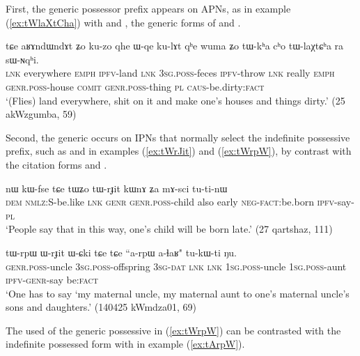 First, the generic possessor prefix appears on APNs, as in example (\ref{ex:tWlaXtCha}) with  and , the generic forms of  and .

\begin{exe}
\ex \label{ex:tWlaXtCha}
\gll tɕe  	aʁɤndɯndɤt  	ʑo  	ku-zo  	qhe  	ɯ-qe  	ku-lɤt  	qʰe	wuma  ʑo  	tɯ-kʰa  	cʰo  	tɯ-laχtɕʰa  	ra  	sɯ-ɴqʰi.  \\
\textsc{lnk} everywhere \textsc{emph} \textsc{ipfv}-land \textsc{lnk} \textsc{3sg.poss}-feces \textsc{ipfv}-throw \textsc{lnk} really \textsc{emph} \textsc{genr.poss}-house \textsc{comit} \textsc{genr.poss}-thing \textsc{pl} \textsc{caus}-be.dirty:\textsc{fact} \\
\glt `(Flies) land everywhere, shit on it and make one's houses and things dirty.' (25 akWzgumba, 59)
\end{exe}

Second, the generic  occurs on IPNs that normally select the  indefinite possessive prefix, such as  and  in examples (\ref{ex:tWrJit}) and (\ref{ex:tWrpW}), by contrast with the citation forms   and .

\begin{exe}
\ex \label{ex:tWrJit}
\gll nɯ 	kɯ-fse 	tɕe 	tɯʑo 	tɯ-rɟit 	kɯnɤ 	ʑa 	mɤ-sci 	tu-ti-nɯ \\
\textsc{dem} \textsc{nmlz}:S-be.like \textsc{lnk} \textsc{genr} \textsc{genr.poss}-child also early \textsc{neg-fact}:be.born \textsc{ipfv}-say-\textsc{pl} \\
\glt `People say that in this way, one's child will be born late.' (27 qartshaz, 111)
\end{exe}

\begin{exe}
\ex \label{ex:tWrpW}
\gll  tɯ-rpɯ 	ɯ-rɟit 	ɯ-ɕki 	tɕe 	tɕe 	``a-rpɯ a-ɬaʁ" 	tu-kɯ-ti 	ŋu. \\
\textsc{genr.poss}-uncle \textsc{3sg.poss}-offspring \textsc{3sg-dat} \textsc{lnk} \textsc{lnk} \textsc{1sg.poss}-uncle \textsc{1sg.poss}-aunt \textsc{ipfv-genr}-say  be:\textsc{fact} \\
\glt `One has to say `my maternal uncle, my maternal aunt to one's maternal uncle's sons and daughters.' (140425 kWmdza01, 69)
\end{exe}

The used of the generic possessive  in (\ref{ex:tWrpW}) can be contrasted with the indefinite possessed form with  in example (\ref{ex:tArpW}).

